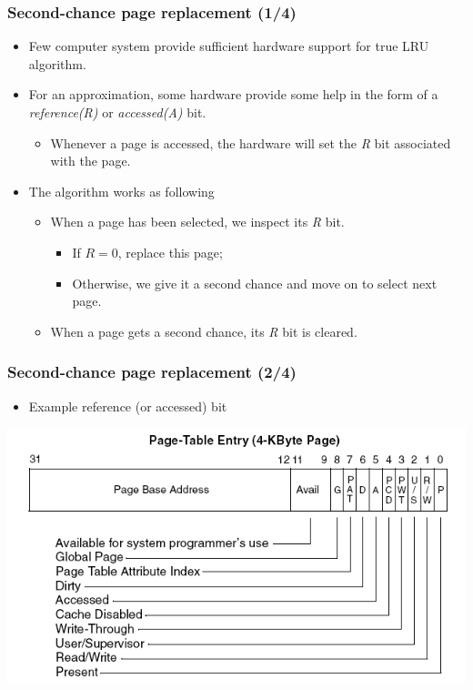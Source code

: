 \documentclass[CJKutf8,xcolor=pdftex,dvipsnames,table]{beamer}
\begin{document}
\begin{CJK*}{UTF8}{song}
  \begin{frame}
    \frametitle{Second-chance page replacement (1/4)} \pause
    \begin{itemize}\parskip=0pt
    \item{Few computer system provide sufficient hardware support for true LRU algorithm.} \pause
    \item{For an approximation, some hardware provide some help in the form of a \emph{reference(R)} or \emph{accessed(A)} bit.} \pause
      \begin{itemize}\parskip=0pt
      \item{Whenever a page is accessed, the hardware will set the \emph{R} bit associated with the page.} \pause
      \end{itemize}
    \item{The algorithm works as following} \pause
      \begin{itemize}\parskip=0pt
      \item{When a page has been selected, we inspect its \emph{R} bit.} \pause
        \begin{itemize}\parskip=0pt
        \item{If $R=0$, replace this page;} \pause
        \item{Otherwise, we give it a second chance and move on to select next page.} \pause
        \end{itemize}
      \item{When a page gets a second chance, its \emph{R} bit is cleared.}
      \end{itemize}
    \end{itemize}
  \end{frame}
  
  \begin{frame}
    \frametitle{Second-chance page replacement (2/4)} \pause
    \begin{itemize}
    \item{Example reference (or accessed) bit} \pause
    \end{itemize}
    \begin{center}
      \includegraphics[scale=.5]{x86pte}
    \end{center}
  \end{frame}
  

\end{CJK*}
\end{document}
